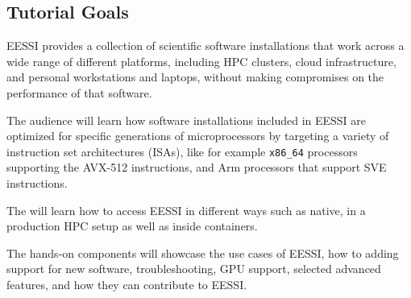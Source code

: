 \subsection*{Tutorial Goals}

EESSI provides a collection of scientific software installations that work across a wide range of
different platforms, including HPC clusters, cloud infrastructure, and personal workstations and laptops, without making
compromises on the performance of that software.

The audience will learn how software installations included in EESSI are optimized for specific generations
of microprocessors by targeting a
variety of instruction set architectures (ISAs), like for example \texttt{x86\_64} processors supporting the
AVX-512 instructions, and Arm processors that support SVE instructions.

The will learn how to access EESSI in different ways such as native, in a production HPC setup as well as inside
containers.

The hands-on components will showcase the use cases of EESSI, how to adding support for new software,
troubleshooting, GPU support, selected advanced features, and how they can contribute to EESSI.

